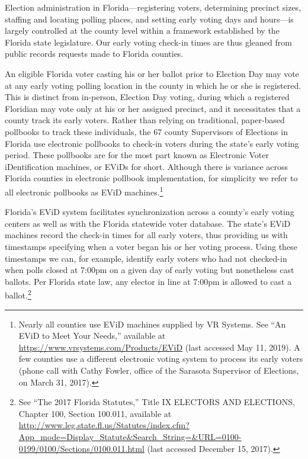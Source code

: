 \documentclass[12pt,titlepage]{article}
\begin{document}
Election administration in Florida---registering voters, determining
precinct sizes, staffing and locating polling places, and setting
early voting days and hours---is largely controlled at the county
level within a framework established by the Florida state
legislature. Our early voting check-in times are thus gleaned from
public records requests made to Florida counties.


An eligible Florida voter casting his or her ballot prior to Election
Day may vote at any early voting polling location in the county in
which he or she is registered. This is distinct from in-person,
Election Day voting, during which a registered Floridian may vote only
at his or her assigned precinct, and it necessitates that a county
track its early voters. Rather than relying on traditional,
paper-based pollbooks to track these individuals, the 67 county
Supervisors of Elections in Florida use electronic pollbooks to
check-in voters during the state's early voting period. These
pollbooks are for the most part known as Electronic Voter
iDentification machines, or EViDs for short. Although there is
variance across Florida counties in electronic pollbook
implementation, for simplicity we refer to all electronic pollbooks as
EViD machines.\footnote{Nearly all counties use EViD machines supplied
  by VR Systems. See ``An EViD to Meet Your Needs,'' available at
  \url{https://www.vrsystems.com/Products/EViD} (last accessed May 11,
  2019).  A few counties use a different electronic voting system to
  process its early voters (phone call with Cathy Fowler, office of
  the Sarasota Supervisor of Elections, on March 31, 2017).}




Florida's EViD system facilitates synchronization across a county's
early voting centers as well as with the Florida statewide voter
database.  The state's EViD machines record the check-in times for all
early voters, thus providing us with \mbox{timestamps} specifying when
a voter began his or her voting process.  Using these timestamps we
can, for example, identify early voters who had not checked-in when
polls closed at 7:00pm on a given day of early voting but nonetheless
cast ballots. Per Florida state law, any elector in line at 7:00pm is
allowed to cast a ballot.\footnote{See ``The 2017 Florida Statutes,''
  Title IX ELECTORS AND ELECTIONS, Chapter 100, Section 100.011,
  available at
  \url{http://www.leg.state.fl.us/Statutes/index.cfm?App\_mode=Display\_Statute\&Search\_String=\&URL=0100-0199/0100/Sections/0100.011.html}
  (last accessed December 15, 2017).}
\end{document}
